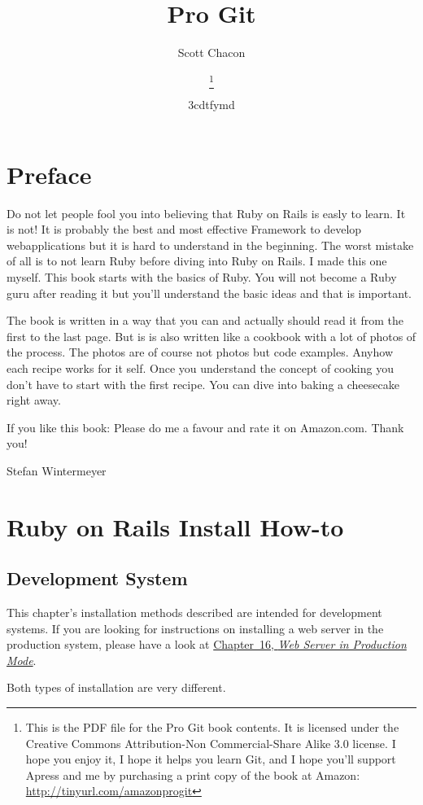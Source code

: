 \documentclass[a4paper]{book}
\title{Pro Git}
\author{Scott Chacon}
\title{\textbf{\savedtitle}}
\author{\textbf{\savedauthor}\thanks{This is the PDF file for the Pro Git book contents. It is licensed under the Creative Commons Attribution-Non Commercial-Share Alike 3.0 license. I hope you enjoy it, I hope it helps you learn Git, and I hope you'll support Apress and me by purchasing a print copy of the book at Amazon: \url{http://tinyurl.com/amazonprogit}}}
\date{\w3cdtfymd}
\makeatletter
\let\savedauthor=\@author
\let\savedtitle=\@title
\newcounter{tab}[chapter]
\newcommand{\chap}[1]{\newpage\thispagestyle{empty}\chapter{#1}\label{chap:\thechapter}}
\makeatother
\begin{document}
\frontmatter
\maketitle
\thispagestyle{empty}
\setcounter{tocdepth}{4}
\tableofcontents\newpage\thispagestyle{empty}

\mainmatter
\fancyhf{}
\fancyhead[LE]{{\small\leftmark}}
\fancyhead[RO]{{\small\rightmark}}
\fancyhead[RE,LO]{{\small\savedauthor\hspace*{1ex}\textbf{\savedtitle}}}
\fancyfoot[LE,RO]{\small\textbf\thepage}
\pagestyle{fancy}

\chap{Preface}\label{preface}

Do not let people fool you into believing that Ruby on Rails is easly to learn. It is not! It is probably the best and most effective Framework to develop webapplications but it is hard to understand in the beginning. The worst mistake of all is to not learn Ruby before diving into Ruby on Rails. I made this one myself. This book starts with the basics of Ruby. You will not become a Ruby guru after reading it but you'll understand the basic ideas and that is important.

The book is written in a way that you can and actually should read it from the first to the last page. But is is also written like a cookbook with a lot of photos of the process. The photos are of course not photos but code examples. Anyhow each recipe works for it self. Once you understand the concept of cooking you don't have to start with the first recipe. You can dive into baking a cheesecake right away.

If you like this book: Please do me a favour and rate it on Amazon.com. Thank you!

Stefan Wintermeyer

\chap{Ruby on Rails Install How-to}\label{ruby-on-rails-install-how-to}

\section{Development System}\label{development-system}

This chapter's installation methods described are intended for development systems. If you are looking for instructions on installing a web server in the production system, please have a look at \hyperref[railsux5fproductionux5fwebserver]{Chapter~16, \emph{Web Server in Production Mode}}.

Both types of installation are very different.
\end{document}
